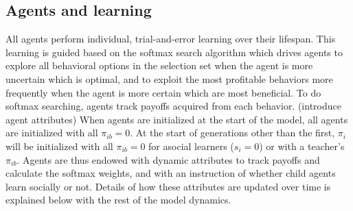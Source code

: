 \documentclass[letterpaper,11.5pt]{scrartcl}
\begin{document}
\subsection{Agents and learning}

All agents perform individual, trial-and-error learning over their lifespan.
This learning is guided based on the softmax search algorithm which drives
agents to explore all behavioral options in the selection set when 
the agent is more uncertain which is optimal, and to exploit the most profitable
behaviors more frequently when the agent is more certain which are most beneficial. 
To do softmax searching, agents track payoffs acquired from each behavior.
(introduce agent attributes)
When agents are initialized at the start of the model, all agents are initialized
with all $\pi_{ib} = 0$. At the start of generations other than the first, 
$\pi_i$ will be initialized with all $\pi_{ib} = 0$ for asocial learners ($s_i = 0$)
or with a teacher's $\pi_{ib}$. 
Agents are thus endowed with dynamic attributes to track payoffs and calculate the
softmax weights, and with an instruction of whether child agents learn socially
or not. Details of how these attributes are updated over time is explained below
with the rest of the model dynamics.
\end{document}
